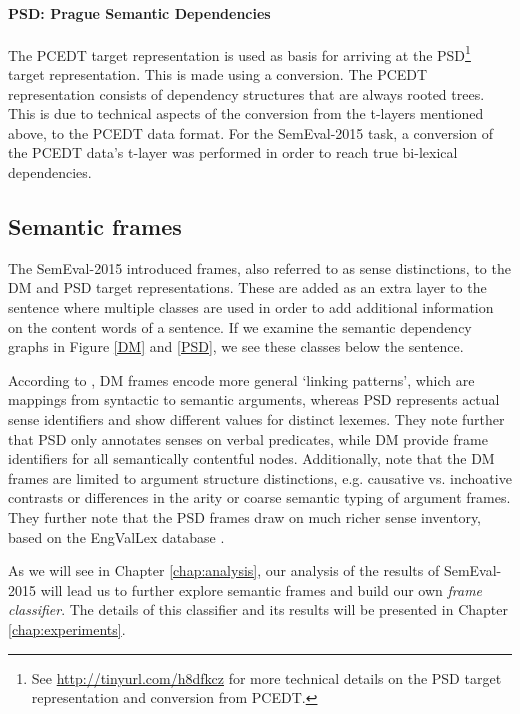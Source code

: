 \paragraph{PSD: Prague Semantic Dependencies} The PCEDT target representation is used as basis for arriving at the PSD\footnote{See \url{http://tinyurl.com/h8dfkcz} for more technical details on the PSD target representation and conversion from PCEDT.} target representation. This is made using a conversion. The PCEDT representation consists of dependency structures that are always rooted trees. This is due to technical aspects of the conversion from the t-layers mentioned above, to the PCEDT data format. For the SemEval-2015 task, a conversion of the PCEDT data's t-layer was performed in order to reach true bi-lexical dependencies.

\subsection{Semantic frames}
\label{sec:frames}

The SemEval-2015 introduced frames, also referred to as sense distinctions, to the DM and PSD target representations. These are added as an extra layer to the sentence where multiple classes are used in order to add additional information on the content words of a sentence. If we examine the semantic dependency graphs in Figure \ref{DM} and \ref{PSD}, we see these classes below the sentence.

According to , DM frames encode more general `linking patterns', which are mappings from syntactic to semantic arguments, whereas PSD represents actual sense identifiers and show different values for distinct lexemes. They note further that PSD only annotates senses on verbal predicates, while DM provide frame identifiers for all semantically contentful nodes. Additionally,  note that the DM frames are limited to argument structure distinctions, e.g. causative vs. inchoative contrasts or differences in the arity or coarse semantic typing of argument frames. They further note that the PSD frames draw on much richer sense inventory, based on the EngValLex database \cite{Cinkova:06}.

As we will see in Chapter \ref{chap:analysis}, our analysis of the results of SemEval-2015 will lead us to further explore semantic frames and build our own \textit{frame classifier}. The details of this classifier and its results will be presented in Chapter \ref{chap:experiments}.

